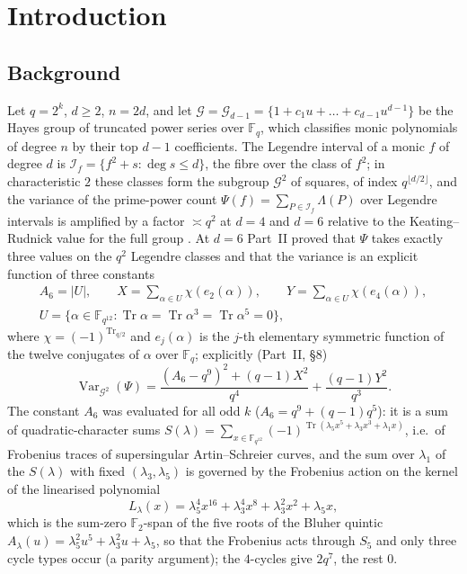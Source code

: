 \documentclass[12pt,a4paper]{amsart}
\theoremstyle{definition}
\newcommand{\F}{\mathbb{F}}
\newcommand{\G}{\mathcal{G}}
\newcommand{\Tr}{\operatorname{Tr}}
\newcommand{\Var}{\operatorname{Var}}
\begin{document}
\maketitle
\tableofcontents

\section{Introduction}

\subsection{Background}
Let $q=2^k$, $d\ge2$, $n=2d$, and let $\G=\G_{d-1}=\{1+c_1u+\dots+c_{d-1}u^{d-1}\}$ be the Hayes group of truncated power series over $\F_q$, which classifies monic polynomials of degree $n$ by their top $d-1$ coefficients. The Legendre interval of a monic $f$ of degree $d$ is $\mathcal I_f=\{f^2+s:\deg s\le d\}$, the fibre over the class of $f^2$; in characteristic $2$ these classes form the subgroup $\G^2$ of squares, of index $q^{\lfloor d/2\rfloor}$, and the variance of the prime-power count $\Psi(f)=\sum_{P\in\mathcal I_f}\Lambda(P)$ over Legendre intervals is amplified by a factor $\asymp q^2$ at $d=4$ and $d=6$ relative to the Keating--Rudnick value for the full group \cite{Chen,ChenII}. At $d=6$ Part~II \cite{ChenII} proved that $\Psi$ takes exactly three values on the $q^2$ Legendre classes and that the variance is an explicit function of three constants
\begin{gather*}
A_6=|U|,\qquad X=\sum_{\alpha\in U}\chi(e_2(\alpha)),\qquad Y=\sum_{\alpha\in U}\chi(e_4(\alpha)),\\
U=\{\alpha\in\F_{q^{12}}:\Tr\alpha=\Tr\alpha^3=\Tr\alpha^5=0\},
\end{gather*}
where $\chi=(-1)^{\Tr_{q/2}}$ and $e_j(\alpha)$ is the $j$-th elementary symmetric function of the twelve conjugates of $\alpha$ over $\F_q$; explicitly (Part~II, \S8)
\[
\Var_{\G^2}(\Psi)=\frac{(A_6-q^9)^2+(q-1)X^2}{q^4}+\frac{(q-1)Y^2}{q^3}.
\]
The constant $A_6$ was evaluated for all odd $k$ ($A_6=q^9+(q-1)q^5$): it is a sum of quadratic-character sums $S(\lambda)=\sum_{x\in\F_{q^{12}}}(-1)^{\Tr(\lambda_5x^5+\lambda_3x^3+\lambda_1x)}$, i.e.\ of Frobenius traces of supersingular Artin--Schreier curves, and the sum over $\lambda_1$ of the $S(\lambda)$ with fixed $(\lambda_3,\lambda_5)$ is governed by the Frobenius action on the kernel of the linearised polynomial
\[
L_\lambda(x)=\lambda_5^4x^{16}+\lambda_3^4x^8+\lambda_3^2x^2+\lambda_5x ,
\]
which is the sum-zero $\F_2$-span of the five roots of the Bluher quintic $A_\lambda(u)=\lambda_5^2u^5+\lambda_3^2u+\lambda_5$, so that the Frobenius acts through $S_5$ and only three cycle types occur (a parity argument); the $4$-cycles give $2q^7$, the rest $0$.
\end{document}
